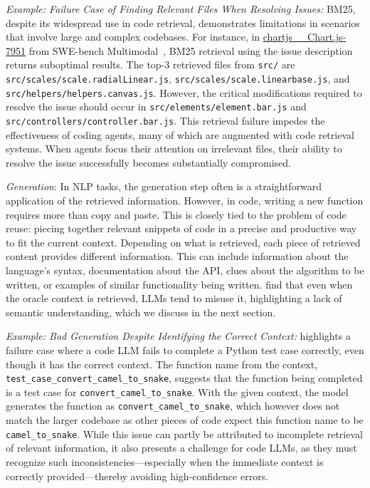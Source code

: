 \begin{tcolorbox}[colback=lightblue, boxrule=0pt, arc=5pt, outer arc=5pt, after skip=10pt plus 2pt]
\textit{Example: Failure Case of Finding Relevant Files When Resolving Issues:} BM25, despite its widespread use in code retrieval, demonstrates limitations in scenarios that involve large and complex codebases. For instance, in \href{https://github.com/chartjs/Chart.js/pull/7951}{chartjs\_\_Chart.js-7951} from SWE-bench Multimodal~\citep{yang2024swe}, BM25 retrieval using the issue description returns suboptimal results. The top-3 retrieved files from \texttt{src/} are \texttt{src/scales/scale.radialLinear.js}, \texttt{src/scales/scale.linearbase.js}, and \texttt{src/helpers/helpers.canvas.js}. However, the critical modifications required to resolve the issue should occur in \texttt{src/elements/element.bar.js} and \texttt{src/controllers/controller.bar.js}. This retrieval failure impedes the effectiveness of coding agents, many of which are augmented with code retrieval systems. When agents focus their attention on irrelevant files, their ability to resolve the issue successfully becomes substantially compromised.
\end{tcolorbox}

\textit{Generation}: 
In NLP tasks, the generation step often is a straightforward application of the retrieved information. However, in code, writing a new function requires more than copy and paste. This is closely tied to the problem of code reuse: piecing together relevant snippets of code in a precise and productive way to fit the current context. Depending on what is retrieved, each piece of retrieved content provides different information. This can include information about the language's syntax, documentation about the API, clues about the algorithm to be written, or examples of similar functionality being written. \citet{ding2023crosscodeeval} find that even when the oracle context is retrieved, LLMs tend to misuse it, highlighting a lack of semantic understanding, which we discuss in the next section.

\begin{tcolorbox}[colback=lightblue, boxrule=0pt, arc=5pt, outer arc=5pt, after skip=10pt plus 2pt]
\textit{Example: Bad Generation Despite Identifying the Correct Context:} \citet{ding2023crosscodeeval} highlights a failure case where a code LLM fails to complete a Python test case correctly, even though it has the correct context. The function name from the context, \texttt{test\_case\_convert\_camel\_to\_snake}, suggests that the function being completed is a test case for \texttt{convert\_camel\_to\_snake}. With the given context, the model generates the function as \texttt{convert\_camel\_to\_snake}, which however does not match the larger codebase as other pieces of code expect this function name to be \texttt{camel\_to\_snake}. While this issue can partly be attributed to incomplete retrieval of relevant information, it also presents a challenge for code LLMs, as they must recognize such inconsistencies—especially when the immediate context is correctly provided—thereby avoiding high-confidence errors.
\end{tcolorbox}


